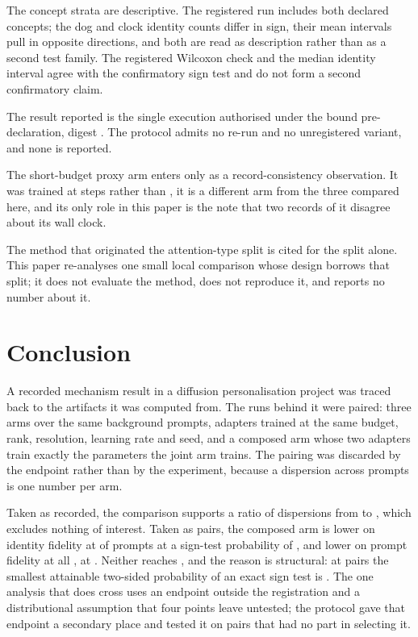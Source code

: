 The concept strata are descriptive. The registered run includes both declared
concepts; the dog and clock identity counts differ in sign, their mean
intervals pull in opposite directions, and both are read as description
rather than as a second test family. The registered Wilcoxon check and the
median identity interval agree with the confirmatory sign test and do not
form a second confirmatory claim.

The result reported is the single execution authorised under the bound
pre-declaration, digest \PredeclarationShaShort{}. The protocol admits no
re-run and no unregistered variant, and none is reported.

The short-budget proxy arm enters only as a record-consistency observation.
It was trained at \ProxySteps{} steps rather than \TrainSteps{}, it is a
different arm from the three compared here, and its only role in this paper is
the note that two records of it disagree about its wall clock.

The method that originated the attention-type split is cited for the split
alone. This paper re-analyses one small local comparison whose design borrows
that split; it does not evaluate the method, does not reproduce it, and
reports no number about it.

\section{Conclusion}

A recorded mechanism result in a diffusion personalisation project was traced
back to the artifacts it was computed from. The runs behind it were paired:
three arms over the same \NPairs{} background prompts, adapters trained at the
same budget, rank, resolution, learning rate and seed, and a composed arm whose
two adapters train exactly the \JointParams{} parameters the joint arm trains.
The pairing was discarded by the endpoint rather than by the experiment,
because a dispersion across prompts is one number per arm.

Taken as recorded, the comparison supports a ratio of dispersions from
\DispLower{} to \DispUpper{}, which excludes nothing of interest. Taken as
pairs, the composed arm is lower on identity fidelity at \IdentityDown{} of
\NPairs{} prompts at a sign-test probability of \IdentitySignP{}, and lower on
prompt fidelity at all \PromptDown{}, at \PromptSignP{}. Neither reaches
\Alpha{}, and the reason is structural: at \NPairs{} pairs the smallest
attainable two-sided probability of an exact sign test is \FloorAtFour{}. The
one analysis that does cross \Alpha{} uses an endpoint outside the registration
and a distributional assumption that four points leave untested; the protocol
gave that endpoint a secondary place and tested it on pairs that had no part
in selecting it.

